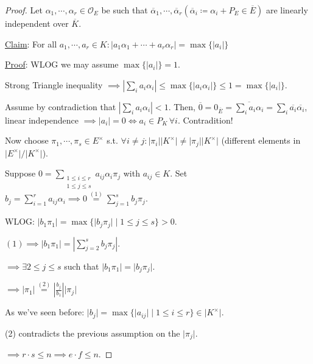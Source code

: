 \documentclass[openany]{amsbook}
\numberwithin{section}{chapter}
\theoremstyle{definition}
\begin{document}
\begin{proof}
    Let \(\alpha_1, \cdots , \alpha_r \in \mathcal{O}_E\) be such that \(\overline{\alpha}_1, \cdots , \overline{\alpha} _r (\overline{\alpha}_i \coloneqq \alpha_i + P_E \in \overline{E})\) are linearly independent over \(\overline{K}\).

    \underline{Claim}: For all \(a_1, \cdots , a_r \in K : \vert a_1 \alpha_1 + \cdots + a_r \alpha_r \vert = \max \{ \vert a_i \vert \}\)
    
    \underline{Proof}: WLOG we may assume \(\max \{ \vert a_i \vert  \} = 1\).

    Strong Triangle inequality \(\implies \left\vert \sum_{i} a_i \alpha_i \right\vert \leq \max \{ \vert a_i \alpha_i \vert \} \leq 1 = \max \{ \vert a_i \vert \} \).

    Assume by contradiction that \(\left\vert \sum_{i} a_i \alpha_i \right\vert < 1\). Then, \(\overline{0} = 0_{\overline{E}} = \overline{\sum_{i} a_i \alpha_i} = \sum_{i} \overline{a_i} \overline{\alpha_i}\), linear independence \(\implies \vert a_i \vert = 0 \iff a_i \in P_K\,\forall i\). Contradition!

    Now choose \(\pi_1, \cdots , \pi_s \in E^\times\) s.t. \(\forall i\neq j: \vert \pi_i \vert \vert K^\times \vert \neq \vert \pi_j \vert \vert K^\times \vert \) (different elements in \(\vert E^\times \vert / \vert K^\times \vert \)).

    Suppose \(0 = \sum_{\substack{1 \leq i \leq r \\ 1 \leq j \leq s}} a_{ij} \alpha_i \pi_j\) with \(a_{ij} \in K\). Set \(b_j = \sum_{i=1}^r a_{ij} \alpha_i \implies 0 \overset{(1)}{=} \sum_{j=1}^s b_j \pi_j\).
    
    WLOG: \(\vert b_1 \pi_1 \vert = \max \{ \vert b_j \pi_j \vert \mid 1 \leq j \leq s \} > 0\).

    \((1) \implies \vert b_1 \pi_1 \vert = \left\vert \sum_{j=2}^s b_j \pi_j \right\vert \).

    \(\implies \exists 2 \leq j \leq s\) such that \(\vert b_1 \pi_1 \vert = \vert b_j \pi_j \vert\).

    \(\implies \vert \pi_1 \vert \overset{(2)}{=} \left\vert \frac{b_j}{b_1} \right\vert \vert \pi_j \vert \) 

    As we've seen before: \(\vert b_j \vert = \max \{ \vert a_{ij} \vert \mid 1 \leq i \leq r \} \in \vert K^\times \vert \).

    (2) contradicts the previous assumption on the \(\vert \pi_j \vert \).

    \(\implies r \cdot s \leq n \implies e\cdot f \leq n\).

\end{proof}
\end{document}
